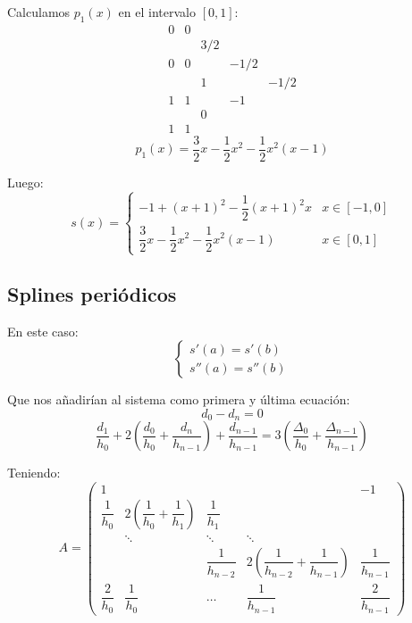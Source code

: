 \bigskip
\noindent
Calculamos $p_1(x)$ en el intervalo $[0,1]$:
$$\begin{array}{c|cccc}
        0 & 0 &     &      &      \\
          &   & 3/2 &      &      \\
        0 & 0 &     & -1/2 &      \\
          &   & 1   &      & -1/2 \\
        1 & 1 &     & -1   &      \\
          &   & 0   &      &      \\
        1 & 1 &     &      &
    \end{array}$$
$$p_1(x) = \dfrac{3}{2}x - \dfrac{1}{2}x^2-\dfrac{1}{2}x^2(x-1)$$

Luego:
$$s(x) = \left\{ \begin{array}{ll}
        -1 + (x+1)^2 -\dfrac{1}{2}(x+1)^2x                   & x \in [-1, 0] \\
        \dfrac{3}{2}x - \dfrac{1}{2}x^2-\dfrac{1}{2}x^2(x-1) & x \in [0,1]
    \end{array} \right.$$

\subsection{Splines periódicos}
\noindent
En este caso:
$$\left\{ \begin{array}{c}
        s'(a) = s'(b) \\
        s''(a) = s''(b)
    \end{array}\right.$$

\noindent
Que nos añadirían al sistema como primera y última ecuación:
$$d_0-d_n=0$$
$$\dfrac{d_1}{h_0} + 2\left(\dfrac{d_0}{h_0} + \dfrac{d_n}{h_{n-1}}\right) + \dfrac{d_{n-1}}{h_{n-1}} =
    3 \left( \dfrac{\Delta_0}{h_0} + \dfrac{\Delta_{n-1}}{h_{n-1}} \right)$$

Teniendo:
$$A=\left( \begin{array}{ccccc}
            1              &                                                 &                    &                                                         & -1                 \\
            \dfrac{1}{h_0} & 2\left( \dfrac{1}{h_0} + \dfrac{1}{h_1} \right) & \dfrac{1}{h_1}     &                                                         &                    \\
                           & \ddots                                          & \ddots             & \ddots                                                  &                    \\
                           &                                                 & \dfrac{1}{h_{n-2}} & 2\left( \dfrac{1}{h_{n-2}} + \dfrac{1}{h_{n-1}} \right) & \dfrac{1}{h_{n-1}} \\
            \dfrac{2}{h_0} & \dfrac{1}{h_0}                                  & \hdots             & \dfrac{1}{h_{n-1}}                                      & \dfrac{2}{h_{n-1}}
        \end{array} \right)$$

